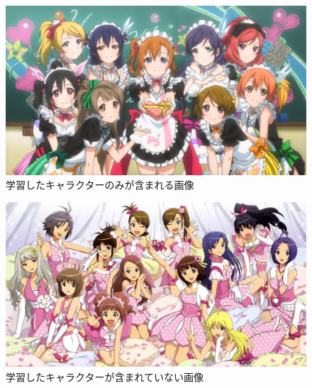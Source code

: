 \documentclass[a4paper,10pt]{jsarticle}
\begin{document}
\begin{figure}[p]
 \centering
 \includegraphics[width=140mm, bb = 0 0 1920 1080]{fig/jpg/lovelive.jpg}
 \caption{学習したキャラクターのみが含まれる画像 }
 \label{224542_17Jul15}
\end{figure}
\begin{figure}[bt]
 \centering
 \includegraphics[width=140mm]{fig/jpg/idolmaster.jpg}
 \caption{学習したキャラクターが含まれていない画像 }
 \label{224550_17Jul15}
\end{figure}
\end{document}
